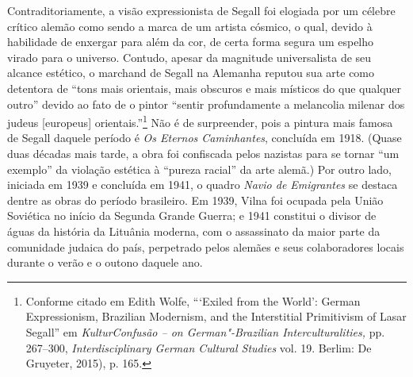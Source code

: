 {Contraditoriamente, a visão expressionista de Segall foi elogiada por um
célebre crítico alemão como sendo a marca de um artista cósmico, o qual,
devido à habilidade de enxergar para além da cor, de certa forma segura
um espelho virado para o universo. Contudo, apesar da magnitude
universalista de seu alcance estético, o marchand de Segall na Alemanha
reputou sua arte como detentora de ``tons mais orientais, mais obscuros
e mais místicos do que qualquer outro'' devido ao fato de o pintor
``sentir profundamente a melancolia milenar dos judeus {[}europeus{]}
orientais.''\footnote{Conforme citado em Edith Wolfe, ```Exiled from
  the World': German Expressionism, Brazilian Modernism, and the
  Interstitial Primitivism of Lasar Segall'' em \textit{KulturConfusão -- on German"-Brazilian Interculturalities,} pp. 267--300, \textit{Interdisciplinary German Cultural Studies} vol. 19. Berlim: De
  Gruyeter, 2015), p. 165.} Não é de surpreender, pois a pintura mais
famosa de Segall daquele período é \textit{Os Eternos Caminhantes},
concluída em 1918. (Quase duas décadas mais tarde, a obra foi confiscada
pelos nazistas para se tornar ``um exemplo'' da violação estética à
``pureza racial'' da arte alemã.) Por outro lado, iniciada em 1939 e
concluída em 1941, o quadro \textit{Navio de Emigrantes} se destaca dentre
as obras do período brasileiro. Em 1939, Vilna foi ocupada pela União
Soviética no início da Segunda Grande Guerra; e 1941 constitui o divisor
de águas da história da Lituânia moderna, com o assassinato da maior
parte da comunidade judaica do país, perpetrado pelos alemães e seus
colaboradores locais durante o verão e o outono daquele ano.

}
